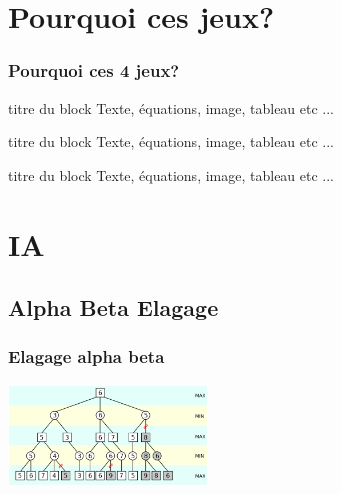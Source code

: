\documentclass[11pt]{beamer}
\begin{document}
\section{Pourquoi ces jeux?}  
  \begin{frame}
  \frametitle{Pourquoi ces 4 jeux?}

\begin{block}{ titre du block }
      Texte, équations, image, tableau etc ...
\end{block}

\begin{block}{ titre du block }
      Texte, équations, image, tableau etc ...
\end{block}

\begin{block}{ titre du block }
      Texte, équations, image, tableau etc ...
\end{block}
			
  \end{frame}
    
\section{IA}
\subsection{Alpha Beta Elagage} 
  \begin{frame}
  \frametitle{Elagage alpha beta}

\includegraphics[width=150pt]{images/alphabeta.png}
  \end{frame}
\end{document}
